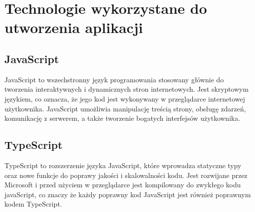 \documentclass[12pt,twoside]{article}
\begin{document}
\section{Technologie wykorzystane do utworzenia aplikacji}
\subsection{JavaScript}

JavaScript to wszechstronny język programowania stosowany głównie do tworzenia interaktywnych i dynamicznych stron internetowych. Jest skryptowym językiem, co oznacza, że jego kod jest wykonywany w przeglądarce internetowej użytkownika. JavaScript umożliwia manipulację treścią strony, obsługę zdarzeń, komunikację z serwerem, a także tworzenie bogatych interfejsów użytkownika.

\subsection{TypeScript}

TypeScript to rozszerzenie języka JavaScript, które wprowadza statyczne typy oraz nowe funkcje do poprawy jakości i skalowalności kodu. Jest rozwijane przez Microsoft i przed użyciem w przeglądarce jest kompilowany do zwykłego kodu javaScript, co znaczy że każdy poprawny kod JavaScript jest również poprawnym kodem TypeScript.
\end{document}
